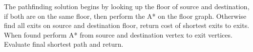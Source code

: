 The pathfinding solution begins by looking up the floor of source and destination, if both are on the same floor, then perform the A* on the floor graph. Otherwise find all exits on source and destination floor, return cost of shortest exits to exits. When found perform A* from source and destination vertex to exit vertices. Evaluate final shortest path and return.